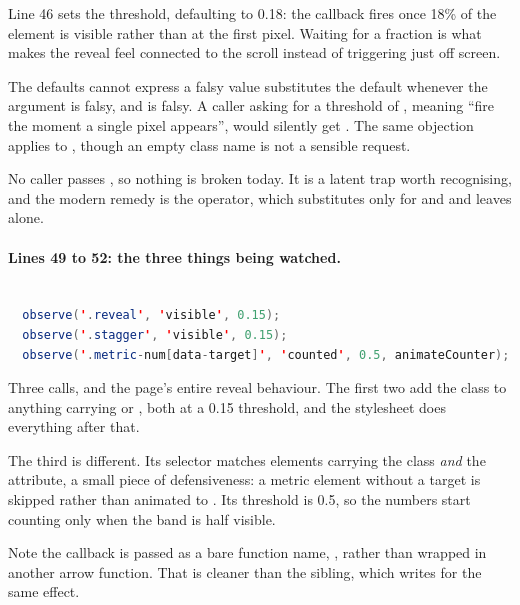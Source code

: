 Line 46 sets the threshold, defaulting to 0.18: the callback fires once 18\% of the
element is visible rather than at the first pixel. Waiting for a fraction is what
makes the reveal feel connected to the scroll instead of triggering just off screen.

\begin{honest}{The defaults cannot express a falsy value}
 substitutes the default whenever the argument is falsy, and
 is falsy. A caller asking for a threshold of , meaning ``fire the
moment a single pixel appears'', would silently get . The same objection
applies to , though an empty class name is not a
sensible request.

No caller passes , so nothing is broken today. It is a latent trap worth
recognising, and the modern remedy is the  operator, which substitutes only
for  and  and leaves  alone.
\end{honest}

\paragraph{Lines 49 to 52: the three things being watched.}

\begin{lstlisting}[language=Java,firstnumber=49,caption={\file{js/main.js}, lines 49--52}]

  observe('.reveal', 'visible', 0.15);
  observe('.stagger', 'visible', 0.15);
  observe('.metric-num[data-target]', 'counted', 0.5, animateCounter);
\end{lstlisting}

Three calls, and the page's entire reveal behaviour. The first two add the class
 to anything carrying  or , both at a 0.15
threshold, and the stylesheet does everything after that.

The third is different. Its selector  matches
elements carrying the class \emph{and} the attribute, a small piece of defensiveness:
a metric element without a target is skipped rather than animated to . Its
threshold is 0.5, so the numbers start counting only when the band is half visible.

Note the callback is passed as a bare function name, , rather
than wrapped in another arrow function. That is cleaner than the sibling, which
writes  for the same effect.

